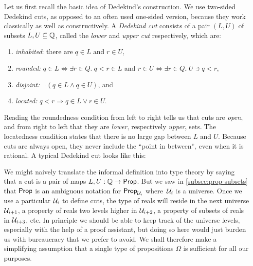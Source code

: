 Let us first recall the basic idea of Dedekind's construction. We use two-sided Dedekind
cuts, as opposed to an often used one-sided version, because they work classically as well
as constructively. A \emph{Dedekind cut} consists of a pair $(L, U)$ of subsets $L, U
\subseteq \mathbb{Q}$, called the \emph{lower} and \emph{upper cut} respectively, which are:
% 
\begin{enumerate}
\item \emph{inhabited}: there are $q \in L$ and $r \in U$,
\item \emph{rounded:} $q \in L \Leftrightarrow \exists r \in Q .\; q < r \in L$
  and $r \in U \Leftrightarrow \exists r \in Q .\; U \ni q < r$,
\item \emph{disjoint:} $\lnot (q \in L \land q \in U)$, and
\item \emph{located:} $q < r \Rightarrow q \in L \lor r \in U$.
\end{enumerate}
%
Reading the roundedness condition from left to right tells us that cuts are \emph{open},
and from right to left that they are \emph{lower}, respectively \emph{upper}, sets. The
locatedness condition states that there is no large gap between $L$ and $U$. Because cuts
are always open, they never include the ``point in between'', even when it is rational. A
typical Dedekind cut looks like this:
%
\begin{center}
\end{center}
%
We might naively translate the informal definition into type theory by saying that a cut
is a pair of maps $L, U : \mathbb{Q} \to \mathsf{Prop}$. But we saw in \autoref{subsec:prop-subsets} that
$\mathsf{Prop}$ is an ambiguous notation for $\mathsf{Prop}_{\mathcal{U}_i}$ where~$\mathcal{U}_i$ is a universe. Once we
use a particular $\mathcal{U}_i$ to define cuts, the type of reals will reside in the next
universe $\mathcal{U}_{i+1}$, a property of reals two levels higher in $\mathcal{U}_{i+2}$, a property of
subsets of reals in $\mathcal{U}_{i+3}$, etc. In principle we should be able to keep track of the
universe levels, especially with the help of a proof assistant, but doing so here would
just burden us with bureaucracy that we prefer to avoid. We shall therefore make a
simplifying assumption that a single type of propositions $\Omega$ is sufficient for all
our purposes.

